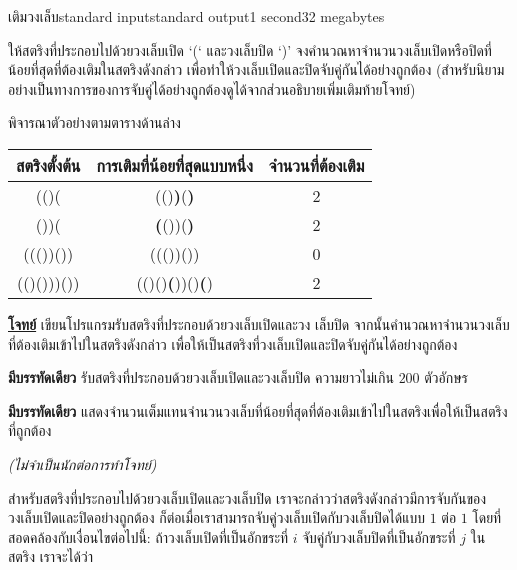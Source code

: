 \documentclass[11pt,a4paper]{article}
\begin{document}
\begin{problem}{เติมวงเล็บ}{standard input}{standard output}{1 second}{32 megabytes}

ให้สตริงที่ประกอบไปด้วยวงเล็บเปิด ‘(‘ และวงเล็บปิด ‘)’  จงคำนวณหาจำนวนวงเล็บเปิดหรือปิดที่น้อยที่สุดที่ต้องเติมในสตริงดังกล่าว เพื่อทำให้วงเล็บเปิดและปิดจับคู่กันได้อย่างถูกต้อง  (สำหรับนิยามอย่างเป็นทางการของการจับคู่ได้อย่างถูกต้องดูได้จากส่วนอธิบายเพิ่มเติมท้ายโจทย์)

พิจารณาตัวอย่างตามตารางด้านล่าง

\begin{center}
\begin{tabular}{|c|c|c|}
\hline
สตริงตั้งต้น & การเติมที่น้อยที่สุดแบบหนึ่ง & จำนวนที่ต้องเติม\\
\hline\hline
(()( & (()\textbf{)}(\textbf{)} & 2\\
\hline
())( & \textbf{(}())(\textbf{)} & 2\\
\hline
((())()) & ((())()) & 0\\
\hline
(()()))()) & (()()\textbf{(}))()\textbf{(}) & 2\\
\hline
\end{tabular}
\end{center}

\bigskip
\underline{\textbf{โจทย์}}  เขียนโปรแกรมรับสตริงที่ประกอบด้วยวงเล็บเปิดและวง เล็บปิด จากนั้นคำนวณหาจำนวนวงเล็บที่ต้องเติมเข้าไปในสตริงดังกล่าว เพื่อให้เป็นสตริงที่วงเล็บเปิดและปิดจับคู่กันได้อย่างถูกต้อง


\InputFile

\textbf{มีบรรทัดเดียว} รับสตริงที่ประกอบด้วยวงเล็บเปิดและวงเล็บปิด ความยาวไม่เกิน $200$ ตัวอักษร


\OutputFile

\textbf{มีบรรทัดเดียว} แสดงจำนวนเต็มแทนจำนวนวงเล็บที่น้อยที่สุดที่ต้องเติมเข้าไปในสตริงเพื่อให้เป็นสตริงที่ถูกต้อง

\Examples

\begin{example}
%
%
\end{example}

\Note \textit{(ไม่จำเป็นนักต่อการทำโจทย์)}

สำหรับสตริงที่ประกอบไปด้วยวงเล็บเปิดและวงเล็บปิด เราจะกล่าวว่าสตริงดังกล่าวมีการจับกันของวงเล็บเปิดและปิดอย่างถูกต้อง ก็ต่อเมื่อเราสามารถจับคู่วงเล็บเปิดกับวงเล็บปิดได้แบบ $1$ ต่อ $1$ โดยที่สอดคล้องกับเงื่อนไขต่อไปนี้:  ถ้าวงเล็บเปิดที่เป็นอักขระที่ $i$ จับคู่กับวงเล็บปิดที่เป็นอักขระที่ $j$ ในสตริง เราจะได้ว่า
\begin{itemize}


\end{itemize}
\end{problem}
\end{document}
